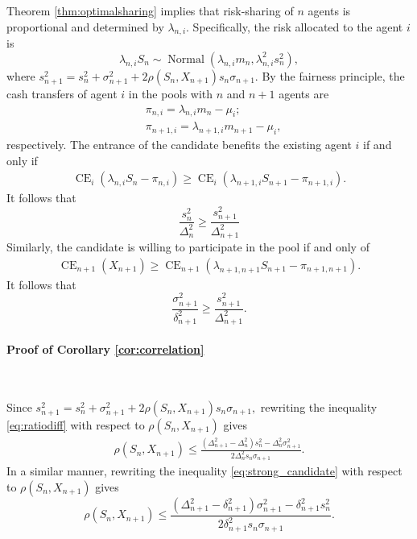 \documentclass[fleqn,mnsc,nonblindrev]{informs4}
\newcommand{\Normal}{\operatorname{Normal}}
\newcommand{\CE}{\operatorname{CE}}
\begin{document}
Theorem \ref{thm:optimalsharing} implies that risk-sharing of $n$ agents is proportional and determined by $\lambda_{n,i}$. Specifically, the risk allocated to the agent $i$ is
\[
\lambda_{n,i}S_n\sim\Normal\left(\lambda_{n,i}m_{n},\lambda_{n,i}^2s_{n}^2\right),
\]
where 
$s_{n+1}^2=s_n^2+\sigma_{n+1}^2+2\rho(S_n,X_{n+1})s_n\sigma_{n+1}.$ 
By the fairness principle, the cash transfers of agent $i$ in the pools with $n$ and $n+1$ agents are
\begin{align*}
&\pi_{n,i}=\lambda_{n,i}m_{n}-\mu_i;\\
&\pi_{n+1,i}=\lambda_{n+1,i}m_{n+1}-\mu_i,
\end{align*}
respectively. The entrance of the candidate benefits the existing agent $i$ if and only if 
\begin{align*}
\CE_i\left(\lambda_{n,i}S_n-\pi_{n,i}\right)\geq\CE_i\left(\lambda_{n+1,i}S_{n+1}-\pi_{n+1,i}\right).
\end{align*}
It follows that
\begin{equation}\label{eq:ratiodiff}
\frac{s_{n}^2}{\Delta_{n}^2}\geq\frac{s_{n+1}^2}{\Delta_{n+1}^2} 
\end{equation}
Similarly, the candidate is willing to participate in the pool if and only of
\begin{align*}
\CE_{n+1}\left(X_{n+1}\right)\geq\CE_{n+1}\left(\lambda_{n+1,n+1}S_{n+1}-\pi_{n+1,n+1}\right).
\end{align*}
It follows that
\begin{equation}\label{eq:strong_candidate}
\frac{\sigma_{n+1}^2}{\delta_{n+1}^2}\geq \frac{s_{n+1}^2}{\Delta_{n+1}^2}. \end{equation}


\paragraph{Proof of Corollary \ref{cor:correlation}}
\

Since $s_{n+1}^2=s_n^2+\sigma_{n+1}^2+2\rho(S_n,X_{n+1})s_n\sigma_{n+1},$ rewriting the inequality \eqref{eq:ratiodiff} with respect to $\rho(S_n,X_{n+1})$ gives
\begin{gather*}
\rho(S_n,X_{n+1})\leq\frac{(\Delta_{n+1}^2-\Delta_n^2)s_{n}^2-\Delta_n^2\sigma_{n+1}^2}{2\Delta_n^2s_{n}\sigma_{n+1}}.
\end{gather*}
In a similar manner, rewriting the inequality \eqref{eq:strong_candidate} with respect to $\rho(S_n,X_{n+1})$ gives
\[
\rho(S_n,X_{n+1})\leq\frac{(\Delta_{n+1}^2-\delta_{n+1}^2)\sigma_{n+1}^2-\delta_{n+1}^2s_{n}^2}{2\delta_{n+1}^2s_n\sigma_{n+1}}.
\]
\end{document}
